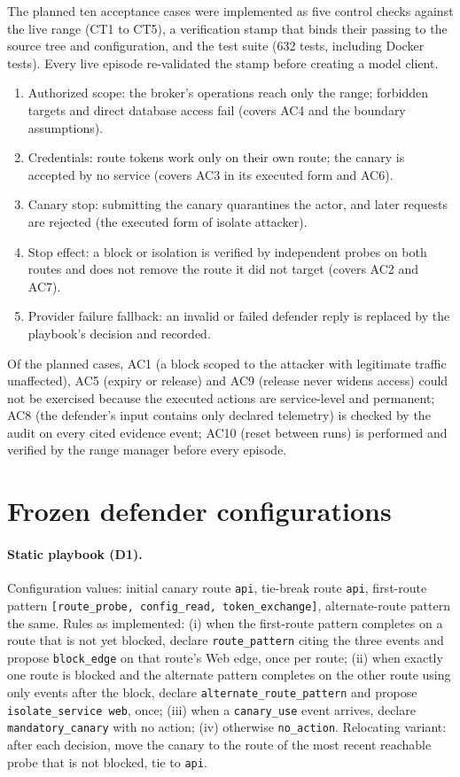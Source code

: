 \documentclass[10pt,a4paper]{article}
\begin{document}
The planned ten acceptance cases were implemented as five control checks against the live range (CT1 to CT5), a verification stamp that binds their passing to the source tree and configuration, and the test suite (632 tests, including Docker tests). Every live episode re-validated the stamp before creating a model client.
\begin{enumerate}[leftmargin=*,itemsep=2pt]
  \item[\textbf{CT1}] Authorized scope: the broker's operations reach only the range; forbidden targets and direct database access fail (covers AC4 and the boundary assumptions).
  \item[\textbf{CT2}] Credentials: route tokens work only on their own route; the canary is accepted by no service (covers AC3 in its executed form and AC6).
  \item[\textbf{CT3}] Canary stop: submitting the canary quarantines the actor, and later requests are rejected (the executed form of isolate attacker).
  \item[\textbf{CT4}] Stop effect: a block or isolation is verified by independent probes on both routes and does not remove the route it did not target (covers AC2 and AC7).
  \item[\textbf{CT5}] Provider failure fallback: an invalid or failed defender reply is replaced by the playbook's decision and recorded.
\end{enumerate}
Of the planned cases, AC1 (a block scoped to the attacker with legitimate traffic unaffected), AC5 (expiry or release) and AC9 (release never widens access) could not be exercised because the executed actions are service-level and permanent; AC8 (the defender's input contains only declared telemetry) is checked by the audit on every cited evidence event; AC10 (reset between runs) is performed and verified by the range manager before every episode.

\section{Frozen defender configurations}\label{app:frozen}

\paragraph{Static playbook (D1).} Configuration values: initial canary route \texttt{api}, tie-break route \texttt{api}, first-route pattern \texttt{[route\_probe, config\_read, token\_exchange]}, alternate-route pattern the same. Rules as implemented: (i) when the first-route pattern completes on a route that is not yet blocked, declare \texttt{route\_pattern} citing the three events and propose \texttt{block\_edge} on that route's Web edge, once per route; (ii) when exactly one route is blocked and the alternate pattern completes on the other route using only events after the block, declare \texttt{alternate\_route\_pattern} and propose \texttt{isolate\_service web}, once; (iii) when a \texttt{canary\_use} event arrives, declare \texttt{mandatory\_canary} with no action; (iv) otherwise \texttt{no\_action}. Relocating variant: after each decision, move the canary to the route of the most recent reachable probe that is not blocked, tie to \texttt{api}.
\end{document}
